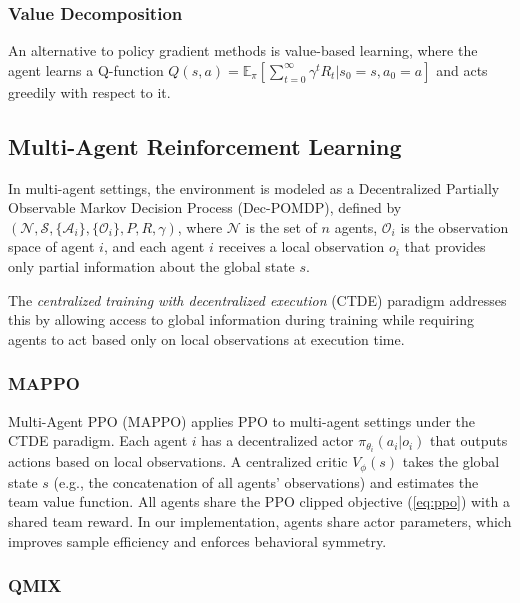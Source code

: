 \documentclass[12pt,a4paper]{article}
\begin{document}
\subsubsection{Value Decomposition}

An alternative to policy gradient methods is value-based learning, where the agent learns a Q-function $Q(s, a) = \mathbb{E}_\pi[\sum_{t=0}^\infty \gamma^t R_t | s_0 = s, a_0 = a]$ and acts greedily with respect to it.

\subsection{Multi-Agent Reinforcement Learning}

In multi-agent settings, the environment is modeled as a Decentralized Partially Observable Markov Decision Process (Dec-POMDP), defined by $(\mathcal{N}, \mathcal{S}, \{\mathcal{A}_i\}, \{\mathcal{O}_i\}, P, R, \gamma)$, where $\mathcal{N}$ is the set of $n$ agents, $\mathcal{O}_i$ is the observation space of agent $i$, and each agent $i$ receives a local observation $o_i$ that provides only partial information about the global state $s$.

The \emph{centralized training with decentralized execution} (CTDE) paradigm \citep{oliehoek2008optimal} addresses this by allowing access to global information during training while requiring agents to act based only on local observations at execution time.

\subsubsection{MAPPO}

Multi-Agent PPO (MAPPO) \citep{yu2022surprising} applies PPO to multi-agent settings under the CTDE paradigm. Each agent $i$ has a decentralized actor $\pi_{\theta_i}(a_i | o_i)$ that outputs actions based on local observations. A centralized critic $V_\phi(s)$ takes the global state $s$ (e.g., the concatenation of all agents' observations) and estimates the team value function. All agents share the PPO clipped objective (\cref{eq:ppo}) with a shared team reward. In our implementation, agents share actor parameters, which improves sample efficiency and enforces behavioral symmetry.

\subsubsection{QMIX}
\end{document}
